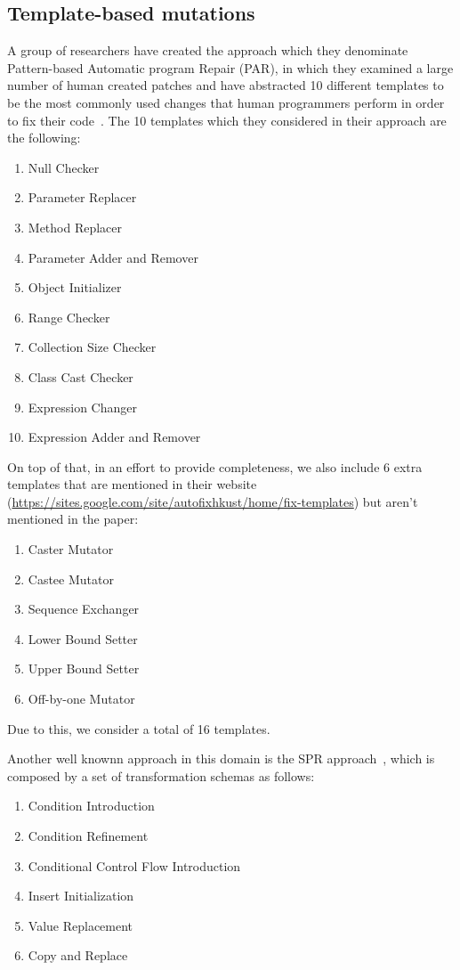 \documentclass[conference]{IEEEtran}
\begin{document}
\subsection{Template-based mutations}
A group of researchers have created the approach which they denominate Pattern-based 
Automatic program Repair (PAR), in which they examined a large number of human 
created patches and have abstracted 10 different templates to be the most 
commonly used changes that human programmers perform in order to fix their code~\cite{kim2013}.
The 10 templates which they considered in their approach are the following:
\begin{enumerate}
 \item Null Checker
 \item Parameter Replacer
 \item Method Replacer
 \item Parameter Adder and Remover
 \item Object Initializer
 \item Range Checker
 \item Collection Size Checker
 \item Class Cast Checker
 \item Expression Changer
 \item Expression Adder and Remover
\end{enumerate}

On top of that, in an effort to provide completeness, we also include 6 extra templates that are mentioned in their website (\url{https://sites.google.com/site/autofixhkust/home/fix-templates}) but aren't mentioned in the paper\cite{kim2013}: 

\begin{enumerate}
\item Caster Mutator
\item Castee Mutator
\item Sequence Exchanger
\item Lower Bound Setter
\item Upper Bound Setter
\item Off-by-one Mutator
\end{enumerate}

Due to this, we consider a total of 16 templates.

Another well knownn approach in this domain is the SPR approach~\cite{fan15}, which is composed by a set of transformation schemas as follows:
\begin{enumerate}
\item Condition Introduction
\item Condition Refinement
\item Conditional Control Flow Introduction
\item Insert Initialization
\item Value Replacement
\item Copy and Replace
\end{enumerate}
\end{document}
